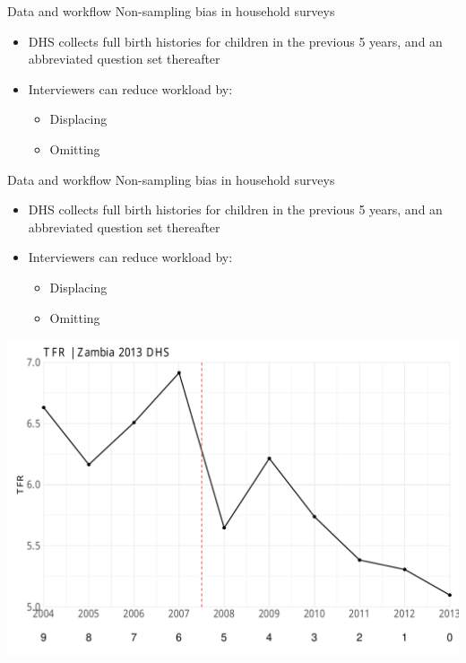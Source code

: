 \documentclass[ignorenonframetext,]{beamer}
\providecommand{\tightlist}{%
  \setlength{\itemsep}{0pt}\setlength{\parskip}{0pt}}
\begin{document}
\begin{frame}[t]{Data and workflow \textbar{} Non-sampling bias in
household surveys}
\protect\hypertarget{data-and-workflow-non-sampling-bias-in-household-surveys}{}

\begin{itemize}
\tightlist
\item
  DHS collects full birth histories for children in the previous 5
  years, and an abbreviated question set thereafter
\item
  Interviewers can reduce workload by:

  \begin{itemize}
  \tightlist
  \item
    Displacing
  \item
    Omitting
  \end{itemize}
\end{itemize}

\end{frame}

\begin{frame}[t]{Data and workflow \textbar{} Non-sampling bias in
household surveys}
\protect\hypertarget{data-and-workflow-non-sampling-bias-in-household-surveys-1}{}

\begin{itemize}
\tightlist
\item
  DHS collects full birth histories for children in the previous 5
  years, and an abbreviated question set thereafter
\item
  Interviewers can reduce workload by:

  \begin{itemize}
  \tightlist
  \item
    Displacing
  \item
    Omitting
  \end{itemize}
\end{itemize}

\begin{center}\includegraphics[height=0.5\textheight]{2020_04_UNPD_files/figure-beamer/unnamed-chunk-3-1} \end{center}

\end{frame}
\end{document}
